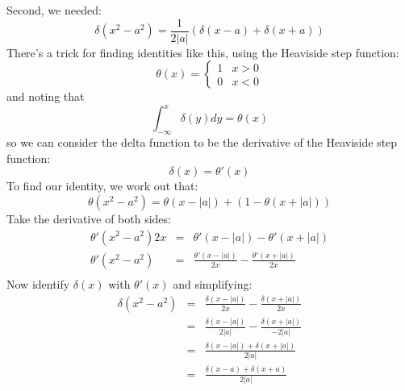 \documentclass[12pt]{article}
\begin{document}
Second, we needed:
$$\delta(x^2 - a^2) = \frac{1}{2|a|} \left( \delta(x-a) + \delta(x+a) \right)$$
There's a trick for finding identities like this, using the Heaviside step function:
$$\theta(x) = \begin{cases} 1 & x > 0 \\ 0 & x < 0 \end{cases}$$
and noting that
$$\int_{-\infty}^x \delta(y) dy = \theta(x)$$
so we can consider the delta function to be the derivative of the Heaviside step function:
$$\delta(x) = \theta'(x)$$
To find our identity, we work out that:
$$\theta(x^2-a^2) = \theta(x-|a|) + (1 - \theta(x + |a|))$$
Take the derivative of both sides:
\begin{eqnarray*}
  \theta'(x^2-a^2) 2x &=& \theta'(x-|a|) - \theta'(x + |a|)\\
  \theta'(x^2-a^2)    &=& \frac{\theta'(x-|a|)}{2x} - \frac{\theta'(x + |a|)}{2x}\\
\end{eqnarray*}
Now identify $\delta(x)$ with $\theta'(x)$ and simplifying:
\begin{eqnarray*}
  \delta(x^2-a^2)    &=& \frac{\delta(x-|a|)}{2x} - \frac{\delta(x + |a|)}{2x}\\
                     &=& \frac{\delta(x-|a|)}{2|a|} - \frac{\delta(x + |a|)}{-2|a|}\\
                     &=& \frac{\delta(x-|a|)+\delta(x + |a|)}{2|a|}\\
                     &=& \frac{\delta(x-a)+\delta(x + a)}{2|a|}\\
\end{eqnarray*}
\end{document}
